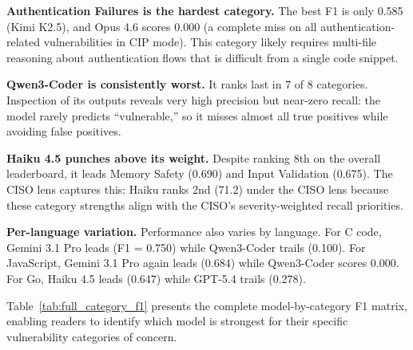 \documentclass[10pt,twocolumn]{article}
\begin{document}
\textbf{Authentication Failures is the hardest category.} The best F1 is only 0.585 (Kimi K2.5), and Opus 4.6 scores 0.000 (a complete miss on all authentication-related vulnerabilities in CIP mode). This category likely requires multi-file reasoning about authentication flows that is difficult from a single code snippet.

\textbf{Qwen3-Coder is consistently worst.} It ranks last in 7 of 8 categories. Inspection of its outputs reveals very high precision but near-zero recall: the model rarely predicts ``vulnerable,'' so it misses almost all true positives while avoiding false positives.

\textbf{Haiku 4.5 punches above its weight.} Despite ranking 8th on the overall leaderboard, it leads Memory Safety (0.690) and Input Validation (0.675). The CISO lens captures this: Haiku ranks 2nd (71.2) under the CISO lens because these category strengths align with the CISO's severity-weighted recall priorities.

\textbf{Per-language variation.} Performance also varies by language. For C code, Gemini 3.1 Pro leads (F1 = 0.750) while Qwen3-Coder trails (0.100). For JavaScript, Gemini 3.1 Pro again leads (0.684) while Qwen3-Coder scores 0.000. For Go, Haiku 4.5 leads (0.647) while GPT-5.4 trails (0.278).

Table~\ref{tab:full_category_f1} presents the complete model-by-category F1 matrix, enabling readers to identify which model is strongest for their specific vulnerability categories of concern.
\end{document}
